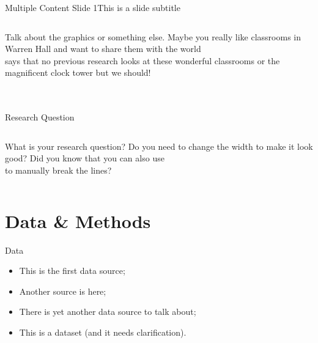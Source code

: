 \documentclass[usenames,dvipsnames]{beamer}
\begin{document}
\begin{frame}{Multiple Content Slide 1}{This is a slide subtitle}
\begin{columns}
\begin{column}{0.65\textwidth}
\begin{figure}
            \end{figure}
            Talk about the graphics or something else. Maybe you really like classrooms in Warren Hall and want to share them with the world \citep{Warren_food_1921}\\
            \vspace{10pt}
            \citet{Berry_food_2018} says that no previous research looks at these wonderful classrooms or the magnificent clock tower but we should!
        \end{column} 
    \end{columns}
\end{frame}

\section{}

\begin{frame}{Research Question}
    \begin{columns}
        \begin{column}{.7\textwidth}\centering
            What is your research question? Do you need to change the width to make it look good? Did you know that you can also use \\ to manually break the lines?
        \end{column}
    \end{columns}
\end{frame}

\section{Data \& Methods}

\begin{frame}{Data}
    \begin{itemize}
        \item This is the first data source;
        \item Another source is here;
        \item There is yet another data source to talk about;
        \item This is a dataset (and it needs clarification).
    \end{itemize}
\end{frame}
\end{document}

